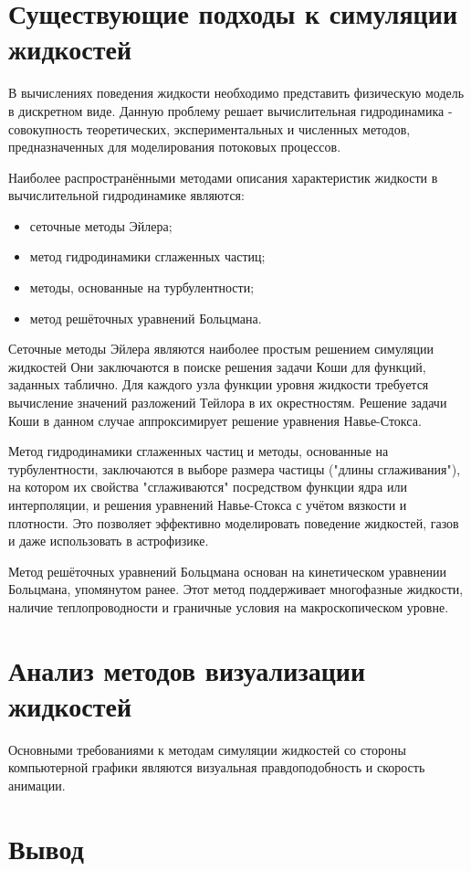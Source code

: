 \section{Существующие подходы к симуляции жидкостей}

В вычислениях поведения жидкости необходимо представить физическую модель в
 дискретном виде. Данную проблему решает вычислительная гидродинамика - совокупность
 теоретических, экспериментальных и численных методов, предназначенных для моделирования
 потоковых процессов.

Наиболее распространёнными методами описания характеристик жидкости в
вычислительной гидродинамике являются:
\begin{itemize}
    \item сеточные методы Эйлера;
    \item метод гидродинамики сглаженных частиц;
    \item методы, основанные на турбулентности;
    \item метод решёточных уравнений Больцмана.
\end{itemize}

Сеточные методы Эйлера являются наиболее простым решением симуляции жидкостей
Они заключаются в поиске решения задачи Коши для функций,
заданных таблично. Для каждого узла функции уровня жидкости
 требуется вычисление значений разложений Тейлора в их окрестностям. Решение задачи Коши
 в данном случае аппроксимирует решение уравнения Навье-Стокса\cite{book:compmath}.

Метод гидродинамики сглаженных частиц и методы, основанные на турбулентности,
заключаются в выборе размера частицы ("длины сглаживания"), на котором их свойства
"сглаживаются" посредством функции ядра или интерполяции, и решения уравнений
Навье-Стокса с учётом вязкости и плотности. Это позволяет эффективно моделировать
поведение жидкостей, газов и даже использовать в астрофизике\cite{site:astro}.

 Метод решёточных уравнений Больцмана основан на кинетическом уравнении Больцмана,
 упомянутом ранее. Этот метод поддерживает многофазные жидкости, наличие теплопроводности
 и граничные условия на макроскопическом уровне\cite{site:habr-physics}.

\section{Анализ методов визуализации жидкостей}

Основными требованиями к методам симуляции жидкостей со стороны компьютерной графики
являются визуальная правдоподобность и скорость анимации.


\section{Вывод}


